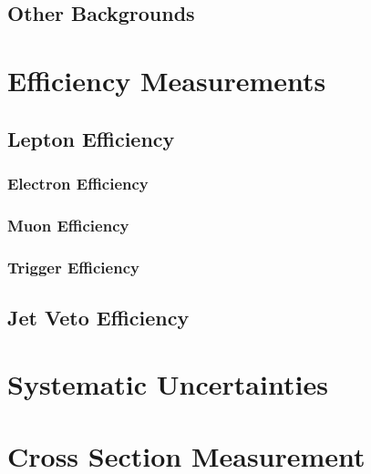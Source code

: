 \documentclass{cmspaper}
\begin{document}
  \subsection{Other Backgrounds}
    \label{sec:bkg_other}
    

\section{Efficiency Measurements}
    \label{sec:alleff}
    \subsection{Lepton Efficiency}
    \label{sec:efficiency}
    
        \subsubsection{Electron Efficiency}
        
        \label{sec:eff_electron}
        \subsubsection{Muon Efficiency}
        
        \label{sec:eff_muon}
        \subsubsection{Trigger Efficiency}
        
        \label{sec:eff_trigger}
    \subsection{Jet Veto Efficiency}
    

\section{Systematic Uncertainties}
  \label{sec:systematics}
  

  \clearpage

\section{Cross Section Measurement}
  \label{sec:xsec}
  

%  
\end{document}
